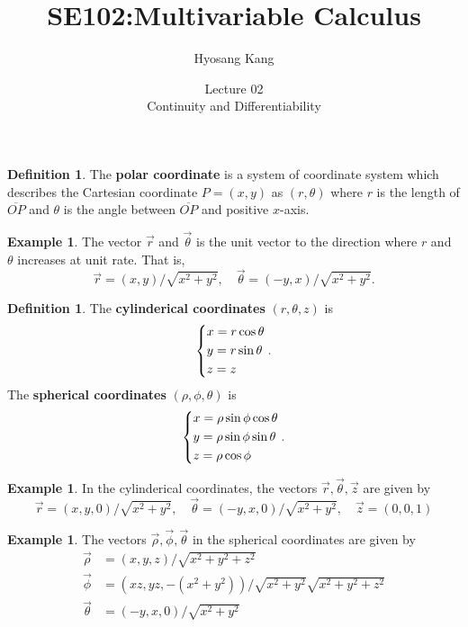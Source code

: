 \documentclass{beamer}
\title[]{SE102:Multivariable Calculus}
\author[]{Hyosang Kang\inst{1}}
\institute[]{\inst{1}Division of Mathematics\\ School of Interdisciplinary Studies\\ DGIST}
\date[]{Lecture 02\\
Continuity and Differentiability}
\theoremstyle{plain}
\theoremstyle{definition}
\newtheorem{defn}[thm]{Definition}
\newtheorem{exmp}[thm]{Example}
\begin{document}
\begin{frame}
\titlepage
\end{frame}

\begin{frame}
\begin{defn}
	The \textbf{polar coordinate} is a system of coordinate system
	which describes the Cartesian coordinate $P=(x,y)$
	as $(r,\theta)$ where $r$ is the length of
	$\overline{OP}$ and $\theta$ is the angle between 
	$\overline{OP}$ and positive $x$-axis.
\end{defn}
\begin{exmp}
	The vector $\vec r$ and $\vec\theta$ is the
	unit vector to the direction where $r$ and 
	$\theta$ increases at unit rate. That is,
	$$\vec r = (x,y)/\sqrt{x^2+y^2},\quad
	\vec \theta = (-y, x)/\sqrt{x^2+y^2}.$$
\end{exmp}
\end{frame}

\begin{frame}
\begin{defn}
	The \textbf{cylinderical
	coordinates} $(r,\theta,z)$ is 
	$$\begin{dcases}
		x = r\cos\theta \\
		y = r\sin\theta \\
		z = z \end{dcases}.$$
	The \textbf{spherical
	coordinates} $(\rho,\phi,\theta)$ is
	$$\begin{dcases}
		x = \rho\sin\phi\cos\theta \\
		y = \rho\sin\phi\sin\theta \\
		z = \rho\cos\phi \end{dcases}.$$
\end{defn}
\end{frame}

\begin{frame}
\begin{exmp}
	In the cylinderical coordinates, the vectors
	$\vec r, \vec \theta, \vec z$ are given by
	$$\vec r = (x,y,0)/\sqrt{x^2+y^2},\quad
	\vec \theta = (-y,x,0)/\sqrt{x^2+y^2},\quad
	\vec z = (0,0,1)$$
\end{exmp}
\begin{exmp}
	The vectors $\vec\rho, \vec\phi, 
	\vec\theta$ in the spherical coordinates are 
	given by
	\begin{align*}
	\vec\rho &= (x,y,z)/\sqrt{x^2+y^2+z^2}\\
	\vec\phi &= (xz,yz,-(x^2+y^2))/\sqrt{x^2+y^2}
	\sqrt{x^2+y^2+z^2}\\
	\vec\theta &= (-y,x,0)/\sqrt{x^2+y^2}
	\end{align*} 
\end{exmp}
\end{frame}
\end{document}
